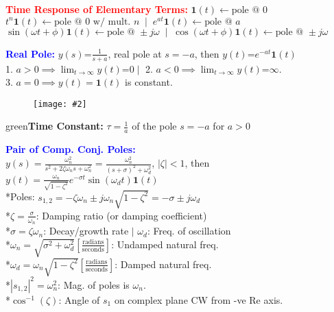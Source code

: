 \documentclass[5pt]{extarticle} %
\newcommand{\customFigure}[3][]{%
    \vspace{-1.5em}
    \begin{figure}[H]
        \centering
        \texttt{[image: \#2]}
    \end{figure}
    \vspace{-1.5em}
}
\begin{document}
\begin{paracol}{3}
{    \textcolor{red}{\textbf{Time Response of Elementary Terms:}} $\mathbf{1}(t) \leftarrow \text{pole @ 0}$ \\
    $t^n \mathbf{1}(t) \leftarrow \text{pole @ $0$ w/ mult. $n$} \; \mid \; e^{at} \mathbf{1}(t) \leftarrow \text{pole @ } a$ \\
    $\sin(\omega t + \phi) \mathbf{1}(t) \leftarrow \text{pole @ } \pm j \omega \; \mid \; \cos(\omega t + \phi) \mathbf{1}(t) \leftarrow \text{pole @ } \pm j \omega$ 

    \switchcolumn

    \textcolor{blue}{\textbf{Real Pole:}} $y(s) \text{=} \frac{1}{s+a}$, real pole at $s = -a$, then $y(t) \text{=} e^{-at} \mathbf{1}(t)$ \\
    1. $a>0 \implies \lim_{t \rightarrow \infty} y(t) \text{=} 0 \mid$ 2. $a<0 \implies \lim_{t \rightarrow \infty} y(t) \text{=} \infty$. \\
    3. $a=0 \implies y(t) = \mathbf{1}(t)$ is constant.
    \customFigure[0.1]{../Images/L10_0.png}

    \textcolor{green}{\textbf{Time Constant:}} $\tau = \frac{1}{a}$ of the pole $s=-a$ for $a>0$

    \textcolor{blue}{\textbf{Pair of Comp. Conj. Poles:}} \\
    $y(s) = \frac{\omega_n^2}{s^2 + 2\zeta\omega_n s + \omega_n^2} = \frac{\omega_n^2}{(s + \sigma)^2 + \omega_d^2}$, $|\zeta| < 1$, then \\
    $y(t) = \frac{\omega_n}{\sqrt{1 - \zeta^2}} e^{-\sigma t} \sin(\omega_d t) \mathbf{1}(t)$ \\
    *Poles: $s_{1,2} = - \zeta \omega_n \pm j \omega_n \sqrt{1 - \zeta^2} = -\sigma \pm j \omega_d$ \\
    *$\zeta = \frac{\sigma}{\omega_n}$: Damping ratio (or damping coefficient) \\
    *$\sigma = \zeta \omega_n$: Decay/growth rate $\mid$ $\omega_d$: Freq. of oscillation \\
    *$\omega_n = \sqrt{\sigma^2 + \omega_d^2} \left[\frac{\text{radians}}{\text{seconds}} \right]$: Undamped natural freq. \\
    *$\omega_d = \omega_n \sqrt{1 - \zeta^2} \left[\frac{\text{radians}}{\text{seconds}} \right]$: Damped natural freq. \\
    *$|s_{1,2}|^2 = \omega_n^2$: Mag. of poles is $\omega_n$. \\
    *$\cos^{-1}(\zeta)$: Angle of $s_1$ on complex plane CW from -ve $\text{Re}$ axis. \\

}
\end{paracol}
\end{document}
